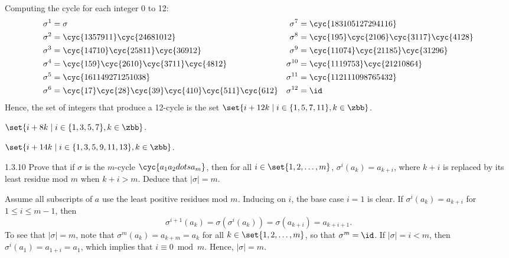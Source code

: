 \begin{solenum}
    \item Computing the cycle for each integer 0 to 12:
    \begin{align*}
        \sigma^1 & = \sigma & \sigma^7 & = \cyc{1 8 3 10 5 12 7 2 9 4 11 6} \\
        \sigma^2 & = \cyc{1 3 5 7 9 11}\cyc{2 4 6 8 10 12} & \sigma^8 & = \cyc{1 9 5}\cyc{2 10 6}\cyc{3 11 7}\cyc{4 12 8} \\
        \sigma^3 & = \cyc{1 4 7 10}\cyc{2 5 8 11}\cyc{3 6 9 12} & \sigma^9 & = \cyc{1 10 7 4}\cyc{2 11 8 5}\cyc{3 12 9 6} \\
        \sigma^4 & = \cyc{1 5 9}\cyc{2 6 10}\cyc{3 7 11}\cyc{4 8 12} & \sigma^{10} & = \cyc{1 11 9 7 5 3}\cyc{2 12 10 8 6 4} \\
        \sigma^5 & = \cyc{1 6 11 4 9 2 7 12 5 10 3 8} & \sigma^{11} & = \cyc{1 12 11 10 9 8 7 6 5 4 3 2} \\
        \sigma^6 & = \cyc{1 7}\cyc{2 8}\cyc{3 9}\cyc{4 10}\cyc{5 11}\cyc{6 12} & \sigma^{12} & = \id
    \end{align*}
    Hence, the set of integers that produce a 12-cycle is the set $\set{i + 12k \mid i \in \{1, 5, 7, 11}, k \in \zbb\}$.
    \item $\set{i + 8k \mid i \in \{1, 3, 5, 7}, k \in \zbb\}$.
    \item $\set{i + 14k \mid i \in \{1, 3, 5, 9, 11, 13}, k \in \zbb\}$. \qedhere
\end{solenum}

\begin{exercise}{1.3.10}
    Prove that if $\sigma$ is the $m$-cycle $\cyc{a_1 a_2 dots a_m}$, then for all $i \in \set{1,2,\dots,m}$, $\sigma^i(a_k) = a_{k+i}$, where $k+i$ is replaced by its least residue mod $m$ when $k+i > m$.
	Deduce that $|\sigma| = m$.
\end{exercise}

\begin{sol}
    Assume all subscripts of $a$ use the least positive residues mod $m$.
	Inducing on $i$, the base case $i = 1$ is clear.
	If $\sigma^i(a_k) = a_{k + i}$ for $1 \leq i \leq m - 1$, then
    \[
    	\sigma^{i + 1}(a_k) = \sigma(\sigma^i(a_k)) = \sigma(a_{k + i}) = a_{k + i + 1}.
    \]
    To see that $|\sigma| = m$, note that $\sigma^m(a_k) = a_{k+m} = a_k$ for all $k \in \set{1,2,\dots,m}$, so that $\sigma^m = \id$.
	If $|\sigma| = i < m$, then $\sigma^i(a_1) = a_{1+i} = a_1$, which implies that $i \equiv 0 \bmod m$.
	Hence, $|\sigma| = m$.
\end{sol}

